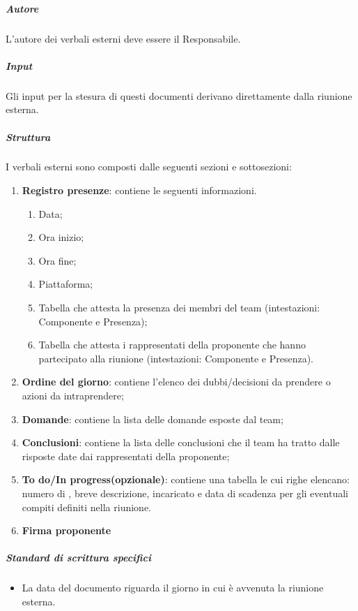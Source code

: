 \subparagraph{Autore}
L'autore dei verbali esterni deve essere il Responsabile.

\subparagraph{Input}
Gli input per la stesura di questi documenti derivano direttamente dalla riunione esterna.

\subparagraph{Struttura}
I verbali esterni sono composti dalle seguenti sezioni e sottosezioni:
\begin{enumerate}
    \item \textbf{Registro presenze}: contiene le seguenti informazioni.
    \begin{enumerate}
        \item Data;
        \item Ora inizio;
        \item Ora fine;
        \item Piattaforma;
        \item Tabella che attesta la presenza dei membri del team (intestazioni: Componente e Presenza);
        \item Tabella che attesta i rappresentati della proponente che hanno partecipato alla riunione (intestazioni: Componente e Presenza).
    \end{enumerate}
    \item \textbf{Ordine del giorno}: contiene l'elenco dei dubbi/decisioni da prendere o azioni da intraprendere;
    
    \item \textbf{Domande}: contiene la lista delle domande esposte dal team;
    
    \item \textbf{Conclusioni}: contiene la lista delle conclusioni che il team ha tratto dalle risposte date dai rappresentati della proponente;

    \item \textbf{To do/In progress(opzionale)}: contiene una tabella le cui righe elencano: numero di , breve descrizione, incaricato e data di scadenza per gli eventuali compiti definiti nella riunione.

    \item \textbf{Firma proponente}
\end{enumerate}

\subparagraph{Standard di scrittura specifici}
\begin{itemize}
    \item La data del documento riguarda il giorno in cui è avvenuta la riunione esterna.
\end{itemize}

